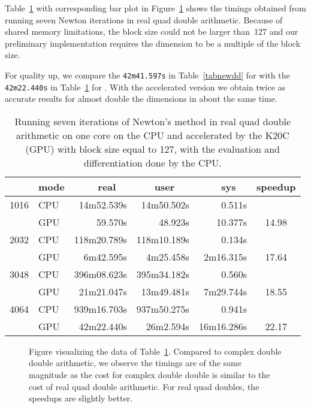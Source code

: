\documentclass{article}
\begin{document}
Table~\ref{tabnewqd} with corresponding bar plot in Figure~\ref{fignewqd}
shows the timings obtained from running
seven Newton iterations in real quad double arithmetic.
Because of shared memory limitations, the block size could not
be larger than~127 and our preliminary implementation requires
the dimension to be a multiple of the block size.

For quality up, we compare the {\tt 42m41.597s} in Table~\ref{tabnewdd}
for  with the {\tt 42m22.440s} in Table~\ref{tabnewqd}
for .  With the accelerated version we obtain twice as
accurate results for almost double the dimensions in about the same time.

\begin{table}[h!]
\begin{center}
\caption{Running seven iterations of Newton's method in real quad double
  arithmetic on one core on the CPU and 
  accelerated by the K20C (GPU) with block size equal to 127,
  with the evaluation and differentiation done by the CPU.}
\label{tabnewqd}
\begin{tabular}{cl|rrr|c}
 & mode &      real~~  &    user ~~  &      sys~~ & speedup \\ \hline
1016 & CPU &   14m52.539s &  14m50.502s &     0.511s & \\
     & GPU &      59.570s &     48.923s &    10.377s & 14.98 \\ \hline
2032 & CPU &  118m20.789s & 118m10.189s &     0.134s & \\
     & GPU &    6m42.595s &   4m25.458s &  2m16.315s & 17.64 \\ \hline
3048 & CPU &  396m08.623s & 395m34.182s &     0.560s & \\
     & GPU &   21m21.047s &  13m49.481s &  7m29.744s & 18.55 \\ \hline
4064 & CPU &  939m16.703s & 937m50.275s &     0.941s & \\
     & GPU &   42m22.440s &   26m2.594s & 16m16.286s & 22.17 \\ 
\end{tabular}
\end{center}
\end{table}

\begin{figure}[hbt]
\begin{center}
\caption{Figure visualizing the data of Table~\ref{tabnewqd}.
Compared to complex double double arithmetic, we observe the timings
are of the same magnitude as the cost for complex double double is
similar to the cost of real quad double arithmetic.
For real quad doubles, the speedups are slightly better.}
\label{fignewqd}
\end{center}
\end{figure}
\end{document}
